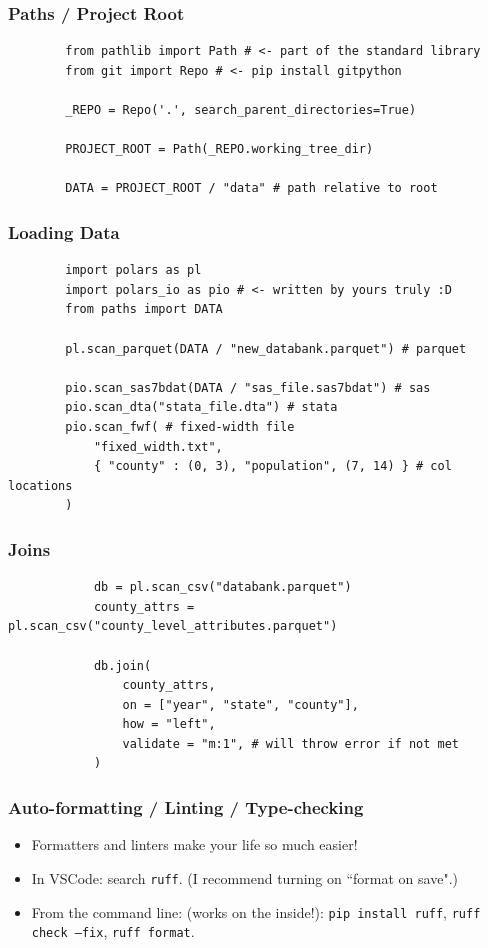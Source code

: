 \documentclass{ali-presentation}
\begin{document}
\begin{frame}[fragile]
    \frametitle{Paths / Project Root}

    \begin{verbatim}
        from pathlib import Path # <- part of the standard library
        from git import Repo # <- pip install gitpython

        _REPO = Repo('.', search_parent_directories=True)

        PROJECT_ROOT = Path(_REPO.working_tree_dir)

        DATA = PROJECT_ROOT / "data" # path relative to root
    \end{verbatim}
\end{frame}

\begin{frame}[fragile]
    \frametitle{Loading Data}

    \begin{verbatim}
        import polars as pl
        import polars_io as pio # <- written by yours truly :D
        from paths import DATA

        pl.scan_parquet(DATA / "new_databank.parquet") # parquet

        pio.scan_sas7bdat(DATA / "sas_file.sas7bdat") # sas
        pio.scan_dta("stata_file.dta") # stata
        pio.scan_fwf( # fixed-width file
            "fixed_width.txt",
            { "county" : (0, 3), "population", (7, 14) } # col locations
        )
    \end{verbatim}
\end{frame}

\begin{frame}[fragile]
    \frametitle{Joins}

    \begin{verbatim}
            db = pl.scan_csv("databank.parquet")
            county_attrs = pl.scan_csv("county_level_attributes.parquet")

            db.join(
                county_attrs,
                on = ["year", "state", "county"],
                how = "left",
                validate = "m:1", # will throw error if not met
            )
    \end{verbatim}
\end{frame}


\begin{frame}
    \frametitle{Auto-formatting / Linting / Type-checking}
    
    \begin{itemize}
        \item Formatters and linters make your life so much easier!
        \item In VSCode: search \texttt{ruff}. (I recommend turning on ``format on save".)
        \item From the command line: (works on the inside!): \texttt{pip install ruff}, \texttt{ruff check --fix}, \texttt{ruff format}.
    \end{itemize}
\end{frame}
\end{document}
